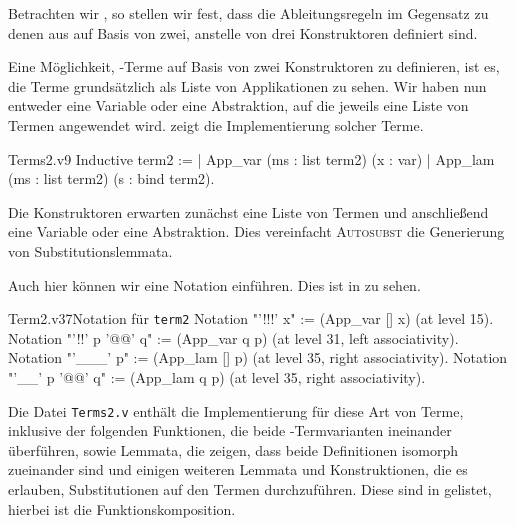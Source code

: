 Betrachten wir , so stellen wir fest, dass die Ableitungsregeln im Gegensatz zu denen aus  auf Basis von zwei, anstelle von drei Konstruktoren definiert sind. 

Eine Möglichkeit, \tlambda-Terme auf Basis von zwei Konstruktoren zu definieren, ist es, die Terme grundsätzlich als Liste von Applikationen zu sehen. Wir haben nun entweder eine Variable oder eine Abstraktion, auf die jeweils eine Liste von Termen angewendet wird.
 zeigt die Implementierung solcher Terme.
\begin{code}[term2]{Terms2.v}{}{9}
Inductive term2 :=
  | App_var (ms : list term2) (x : var)
  | App_lam (ms : list term2) (s : {bind term2}).
\end{code}
\begin{remark}
    Die Konstruktoren erwarten zunächst eine Liste von Termen und anschließend eine Variable oder eine Abstraktion. Dies vereinfacht \textsc{Autosubst} die Generierung von Substitutionslemmata.
\end{remark}

Auch hier können wir eine Notation einführen. Dies ist in  zu sehen.
\begin{ccode}{Term2.v}{}{37}{Notation für \texttt{term2}}
Notation "'!!!' x" := (App_var [] x) (at level 15).
Notation "'!!' p '@@' q" := (App_var q p) 
  (at level 31, left associativity).
Notation "'\___' p" := (App_lam [] p) 
  (at level 35, right associativity). 
Notation "'\__' p '@@' q" := (App_lam q p) 
  (at level 35, right associativity). 
\end{ccode}    

Die Datei \texttt{Terms2.v} enthält die Implementierung für diese Art von Terme, inklusive der folgenden Funktionen, die beide \tlambda-Termvarianten ineinander überführen, sowie Lemmata, die zeigen, dass beide Definitionen isomorph zueinander sind und einigen weiteren Lemmata und Konstruktionen, die es erlauben, Substitutionen auf den Termen durchzuführen. Diese sind in  gelistet, hierbei ist \icoq{>>>} die Funktionskomposition.
 
